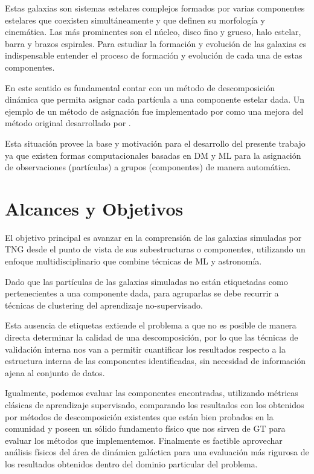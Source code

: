 Estas galaxias son sistemas estelares complejos formados por varias componentes estelares que coexisten simultáneamente y que definen su morfología y cinemática. Las más prominentes son el núcleo, disco fino y grueso, halo estelar, barra y brazos espirales. Para estudiar la formación y evolución de las galaxias es indispensable entender el proceso de formación y evolución de cada una de estas componentes. 

En este sentido es fundamental contar con un método de descomposición dinámica que permita asignar cada partícula a una componente estelar dada. Un ejemplo de un método de asignación fue implementado por \citet{cristiani2020descomposicion} como una mejora del método original desarrollado por \citet{abadi2003simulations}.

Esta situación provee la base y motivación para el desarrollo del presente trabajo ya que existen formas computacionales basadas en \gls{DM} y \gls{ML} para la asignación de observaciones (partículas) a grupos (componentes) de manera automática.

\section{Alcances y Objetivos}

El objetivo principal es avanzar en la comprensión de las galaxias simuladas por \gls{TNG} desde el punto de vista de sus subestructuras o componentes, utilizando un enfoque multidisciplinario que combine técnicas de \gls{ML} y astronomía. 

Dado que las partículas de las galaxias simuladas no están etiquetadas como pertenecientes a una componente dada, para agruparlas se debe recurrir a técnicas de clustering del aprendizaje no-supervisado.

Esta ausencia de etiquetas extiende el problema a que no es posible de manera directa determinar la calidad de una descomposición, por lo que las técnicas de validación interna nos van a permitir cuantificar los resultados respecto a la estructura interna de las componentes identificadas, sin necesidad de información ajena al conjunto de datos. 

Igualmente, podemos evaluar las componentes encontradas, utilizando métricas clásicas de aprendizaje supervisado, comparando los resultados con los obtenidos por métodos de descomposición existentes que están bien probados en la comunidad y poseen un sólido fundamento físico \citep{abadi2003simulations, du2019identifying} que nos sirven de \gls{GT} para evaluar los métodos que implementemos. Finalmente es factible aprovechar análisis físicos del área de dinámica galáctica para una evaluación más rigurosa de los resultados obtenidos dentro del dominio particular del problema.

